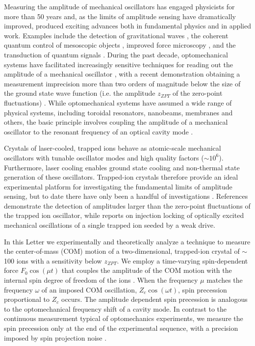 \documentclass[aps,prl,twocolumn,superscriptaddress,floatfix]{revtex4-1}
\begin{document}
Measuring the amplitude of mechanical oscillators has engaged physicists for more than 50 years and, as the limits of amplitude sensing have dramatically improved, produced exciting advances both in fundamental physics and in applied work. Examples include the detection of gravitational waves , the coherent quantum control of mesoscopic objects , improved force microscopy , and the transduction of quantum signals . During the past decade, optomechanical systems have facilitated increasingly sensitive techniques for reading out the amplitude of a mechanical oscillator , with a recent demonstration obtaining a measurement imprecision more than two orders of magnitude below the size of the ground state wave function (i.e. the amplitude $z_{ZPT}$ of the zero-point fluctuations) . While optomechanical systems have assumed a wide range of physical systems, including toroidal resonators, nanobeams, membranes and others, the basic principle involves coupling the amplitude of a mechanical oscillator to the resonant frequency of an optical cavity mode .

Crystals of laser-cooled, trapped ions behave as atomic-scale mechanical oscillators  with tunable oscillator modes and high quality factors ($ {\sim} 10^6$). Furthermore, laser cooling enables ground state cooling and non-thermal state generation of these oscillators. Trapped-ion crystals therefore provide an ideal experimental platform for investigating the fundamental limits of amplitude sensing, but to date there have only been a handful of investigations . References  demonstrate the detection of amplitudes larger than the zero-point fluctuations of the trapped ion oscillator, while reports on injection locking of optically excited mechanical oscillations of a single trapped ion seeded by a weak drive.

In this Letter we experimentally and theoretically analyze a technique to measure the center-of-mass (COM) motion of a two-dimensional, trapped-ion crystal of $\sim$100 ions with a sensitivity below $z_{ZPT}$. We employ a time-varying spin-dependent force $F_0\cos\left(\mu t\right)$ that couples the amplitude of the COM motion with the internal spin degree of freedom of the ions . When the frequency $\mu$ matches the frequency $\omega$ of an imposed COM oscillation, $Z_{c}\cos\left(\omega t\right)$, spin precession proportional to $Z_{c}$ occurs. The amplitude dependent spin precession is analogous to the optomechanical frequency shift of a cavity mode. In contrast to the continuous measurement typical of optomechanics experiments, we measure the spin precession only at the end of the experimental sequence, with a precision imposed by spin projection noise .
\end{document}
